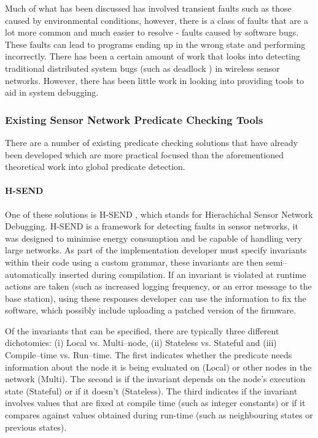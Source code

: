 Much of what has been discussed has involved transient faults such as those caused by environmental conditions, however, there is a class of faults that are a lot more common and much easier to resolve - faults caused by software bugs. These faults can lead to programs ending up in the wrong state and performing incorrectly. There has been a certain amount of work that looks into detecting traditional distributed system bugs (such as deadlock \cite{5587352,5284172}) in wireless sensor networks. However, there has been little work in looking into providing tools to aid in system debugging.

\subsubsection{Existing Sensor Network Predicate Checking Tools}

There are a number of existing predicate checking solutions that have already been developed which are more practical focused than the aforementioned theoretical work into global predicate detection.

\paragraph{H-SEND} One of these solutions is H-SEND \cite{herbert2007adaptive}, which stands for Hierachichal Sensor Network Debugging. H-SEND is a framework for detecting faults in sensor networks, it was designed to minimise energy consumption and be capable of handling very large networks. As part of the implementation developer must specify invariants within their code using a custom grammar, these invariants are then semi--automatically inserted during compilation. If an invariant is violated at runtime actions are taken (such as increased logging frequency, or an error message to the base station), using these responses developer can use the information to fix the software, which possibly include uploading a patched version of the firmware.

Of the invariants that can be specified, there are typically three different dichotomies: (i) Local vs. Multi--node, (ii) Stateless vs. Stateful and (iii) Compile--time vs. Run--time. The first indicates whether the predicate needs information about the node it is being evaluated on (Local) or other nodes in the network (Multi). The second is if the invariant depends on the node's execution state (Stateful) or if it doesn't (Stateless). The third indicates if the invariant involves values that are fixed at compile time (such as integer constants) or if it compares against values obtained during run-time (such as neighbouring states or previous states).

